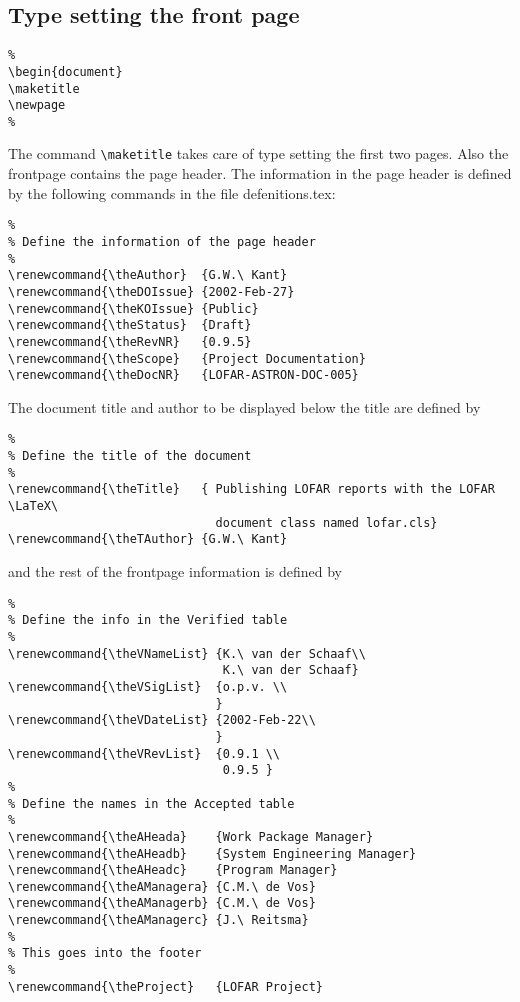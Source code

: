 \documentclass[]{lofar}
\begin{document}
\subsection{Type setting the front page}
%
\begin{verbatim}
%
\begin{document}
\maketitle
\newpage
%
\end{verbatim}
%
The command \verb=\maketitle= takes care of type setting the first two
pages. Also the frontpage contains the page header. The information in
the page header is defined by the following commands in the file
\textsf{defenitions.tex}:
\newpage
%
\begin{verbatim}
%
% Define the information of the page header
%
\renewcommand{\theAuthor}  {G.W.\ Kant}
\renewcommand{\theDOIssue} {2002-Feb-27}
\renewcommand{\theKOIssue} {Public}
\renewcommand{\theStatus}  {Draft}
\renewcommand{\theRevNR}   {0.9.5}
\renewcommand{\theScope}   {Project Documentation}
\renewcommand{\theDocNR}   {LOFAR-ASTRON-DOC-005}
\end{verbatim}
%
The document title and author to be displayed below the title are defined by
%
\begin{verbatim}
%
% Define the title of the document
%
\renewcommand{\theTitle}   { Publishing LOFAR reports with the LOFAR \LaTeX\ 
                             document class named lofar.cls}
\renewcommand{\theTAuthor} {G.W.\ Kant}
\end{verbatim}
%
and the rest of the frontpage information is defined by
%
\begin{verbatim}
%
% Define the info in the Verified table
%
\renewcommand{\theVNameList} {K.\ van der Schaaf\\
                              K.\ van der Schaaf}
\renewcommand{\theVSigList}  {o.p.v. \\
                             }
\renewcommand{\theVDateList} {2002-Feb-22\\
                             }
\renewcommand{\theVRevList}  {0.9.1 \\
                              0.9.5 }
%
% Define the names in the Accepted table
%
\renewcommand{\theAHeada}    {Work Package Manager}
\renewcommand{\theAHeadb}    {System Engineering Manager}
\renewcommand{\theAHeadc}    {Program Manager}
\renewcommand{\theAManagera} {C.M.\ de Vos}
\renewcommand{\theAManagerb} {C.M.\ de Vos}
\renewcommand{\theAManagerc} {J.\ Reitsma}
%
% This goes into the footer
%
\renewcommand{\theProject}   {LOFAR Project}
\end{verbatim}
%
\end{document}
